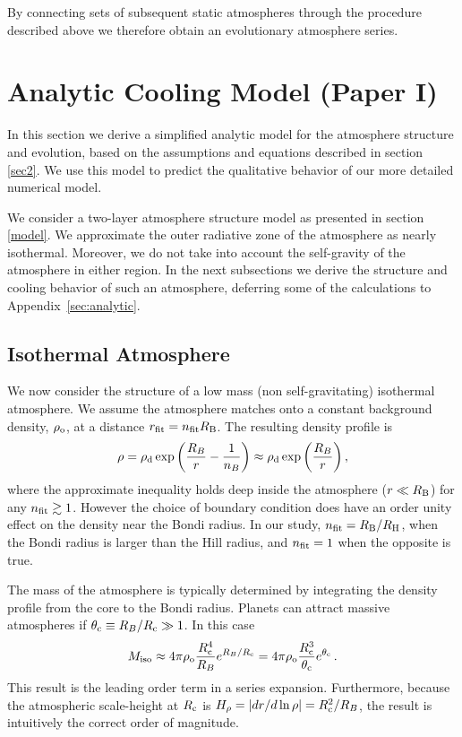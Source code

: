 \documentclass[apj]{emulateapj}
\newcommand{\App}[1]{Appendix~\ref{#1}}
\newcommand{\RB}{R_{\rm B}}
\newcommand{\co}{_{\rm c}}
\newcommand{\di}{_{\rm o}}
\begin{document}
By connecting sets of subsequent static atmospheres through the procedure described above we therefore obtain an evolutionary atmosphere series. 

\section{Analytic Cooling Model \textbf{(Paper I)}}
\label{analytic}

In this section we derive a simplified analytic model for the atmosphere structure and evolution, based on the assumptions and equations described in section \ref{sec2}. We use this model to predict the qualitative behavior of our more detailed numerical model. %

We consider a two-layer atmosphere structure model as presented in section \ref{model}. We approximate the outer radiative zone of the atmosphere as nearly isothermal. Moreover, we do not take into account the self-gravity of the atmosphere in either region. In the next subsections we derive the structure and cooling behavior of such an atmosphere, deferring some of the calculations to \App{sec:analytic}.

\subsection{Isothermal Atmosphere}
\label{iso}

We now consider the structure of a low mass (non self-gravitating) isothermal atmosphere.  We assume the atmosphere matches onto a constant background density, $\rho\di$, at a distance $r_{\rm fit} = n_{\rm fit} \RB$.  The resulting density profile is
\begin{equation} \label{eq:rhoiso}
\rho = \rho_{\rm d} \exp \left({R_B \over r} - {1 \over n_B} \right) \approx   \rho_{\rm{d}} \exp \left(R_B \over r  \right),
\end{equation} 
where the approximate inequality holds deep inside the atmosphere ($r \ll \RB$) for any $n_{\rm fit} \gtrsim 1$.  However the choice of boundary condition does have an order unity effect on the density near the Bondi radius. In our study, $n_{\rm{fit}}=R_{\rm B}/R_{\rm H}$, when the Bondi radius is larger than the Hill radius, and $n_{\rm fit}=1$ when the opposite is true.  

The mass of the atmosphere is typically determined by integrating the density profile from the core to the Bondi radius.  Planets can attract massive atmospheres if $\theta\co \equiv R_B/R\co \gg 1$.  In this case
\begin{equation} \label{eq:MatmISO}
M_{\rm iso} \approx 4 \pi \rho\di {R\co^4 \over R_B} e^{R_B/R\co} = 4 \pi \rho\di {R\co^3 \over \theta\co} e^{\theta\co}\, .
\end{equation} 
This result is the leading order term in a series expansion.  Furthermore, because the atmospheric scale-height at $R\co$ is $H_\rho = |dr /d\ln\rho| = R\co^2/R_B$, the result is intuitively the correct order of magnitude.
\end{document}
